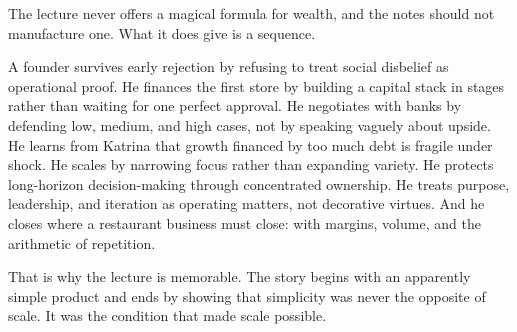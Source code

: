 The lecture never offers a magical formula for wealth, and the notes should not manufacture one. What it does give is a sequence.

A founder survives early rejection by refusing to treat social disbelief as operational proof. He finances the first store by building a capital stack in stages rather than waiting for one perfect approval. He negotiates with banks by defending low, medium, and high cases, not by speaking vaguely about upside. He learns from Katrina that growth financed by too much debt is fragile under shock. He scales by narrowing focus rather than expanding variety. He protects long-horizon decision-making through concentrated ownership. He treats purpose, leadership, and iteration as operating matters, not decorative virtues. And he closes where a restaurant business must close: with margins, volume, and the arithmetic of repetition.

That is why the lecture is memorable. The story begins with an apparently simple product and ends by showing that simplicity was never the opposite of scale. It was the condition that made scale possible.
